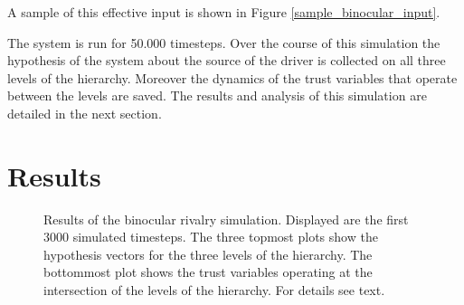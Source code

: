 \documentclass{frontiersSCNS} %
\begin{document}
	 A sample of this effective input is shown in Figure \ref{sample_binocular_input}. 
	

   	The system is run for 50.000 timesteps. Over the course of this simulation the hypothesis of the system about the source of the driver is collected on all three levels of the hierarchy. Moreover the dynamics of the trust variables that operate between the levels are saved. The results and analysis of this simulation are detailed in the next section. 


\section{Results}
    \label{sec:results}	
	    \begin{figure}
	    	\centering
	    	     
	
	    	\caption[Results of the binocular rivalry simulation]{Results of the binocular rivalry simulation. Displayed are the first 3000 simulated timesteps. The three topmost plots show the hypothesis vectors for the three levels of the hierarchy. The bottommost plot shows the trust variables operating at the intersection of the levels of the hierarchy. For details see text.}
	     	\label{binocular_result}
	    \end{figure}
	
\end{document}
